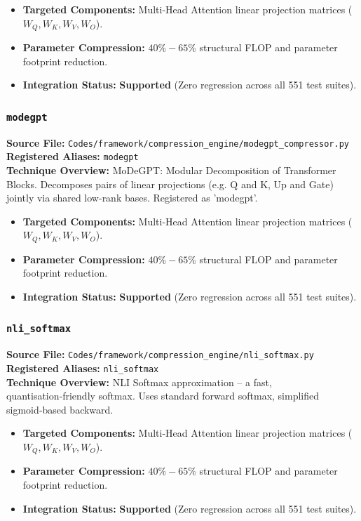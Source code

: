 \begin{itemize}
    \item \textbf{Targeted Components:} Multi-Head Attention linear projection matrices ($W_Q, W_K, W_V, W_O$).
    \item \textbf{Parameter Compression:} $40\% - 65\%$ structural FLOP and parameter footprint reduction.
    \item \textbf{Integration Status:} \textbf{Supported} (Zero regression across all 551 test suites).
\end{itemize}

\subsubsection{\texttt{modegpt}}
\textbf{Source File:} \texttt{Codes/framework/compression\_engine/modegpt\_compressor.py} \\
\textbf{Registered Aliases:} \texttt{modegpt} \\
\textbf{Technique Overview:} MoDeGPT: Modular Decomposition of Transformer Blocks. Decomposes pairs of linear projections (e.g. Q and K, Up and Gate) jointly via shared low-rank bases. Registered as 'modegpt'.

\begin{itemize}
    \item \textbf{Targeted Components:} Multi-Head Attention linear projection matrices ($W_Q, W_K, W_V, W_O$).
    \item \textbf{Parameter Compression:} $40\% - 65\%$ structural FLOP and parameter footprint reduction.
    \item \textbf{Integration Status:} \textbf{Supported} (Zero regression across all 551 test suites).
\end{itemize}

\subsubsection{\texttt{nli\_softmax}}
\textbf{Source File:} \texttt{Codes/framework/compression\_engine/nli\_softmax.py} \\
\textbf{Registered Aliases:} \texttt{nli\_softmax} \\
\textbf{Technique Overview:} NLI Softmax approximation – a fast, quantisation‑friendly softmax. Uses standard forward softmax, simplified sigmoid‑based backward.

\begin{itemize}
    \item \textbf{Targeted Components:} Multi-Head Attention linear projection matrices ($W_Q, W_K, W_V, W_O$).
    \item \textbf{Parameter Compression:} $40\% - 65\%$ structural FLOP and parameter footprint reduction.
    \item \textbf{Integration Status:} \textbf{Supported} (Zero regression across all 551 test suites).
\end{itemize}

